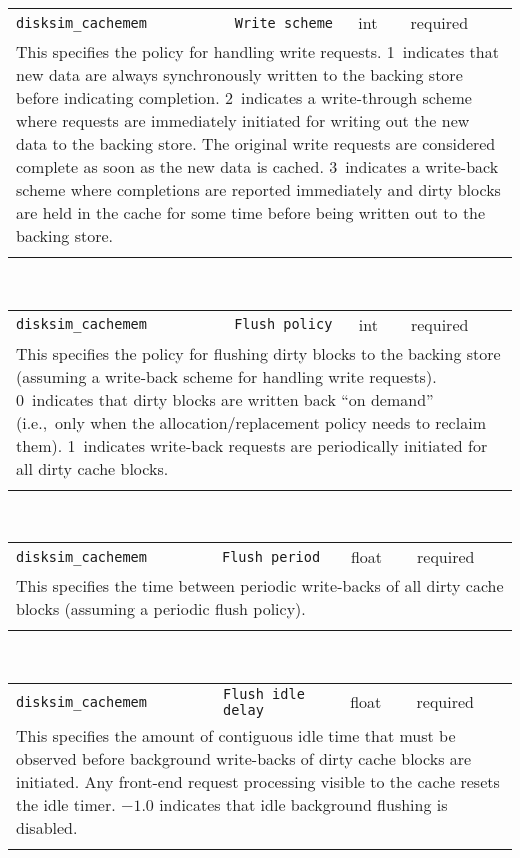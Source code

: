 \noindent 
\begin{tabular}{|p{1.5in}|p{3.5in}|p{0.5in}|p{0.5in}|}
\cline{1-4}
\texttt{disksim\_cachemem} & \texttt{Write scheme} & int & required \\ 
\cline{1-4}
\multicolumn{4}{|p{6in}|}{
This specifies the policy for handling write requests.
1~indicates that new data are always synchronously written to the
backing store before indicating completion.
2~indicates a write-through scheme where requests are immediately
initiated for writing out the new data to the backing store. The
original write requests are considered complete as soon as the new
data is cached.
3~indicates a write-back scheme where completions are reported
immediately and dirty blocks are held in the cache for some time
before being written out to the backing store.
}\\ 
\cline{1-4}
\multicolumn{4}{p{5in}}{}\\
\end{tabular}\\ 
\noindent 
\begin{tabular}{|p{1.5in}|p{3.5in}|p{0.5in}|p{0.5in}|}
\cline{1-4}
\texttt{disksim\_cachemem} & \texttt{Flush policy} & int & required \\ 
\cline{1-4}
\multicolumn{4}{|p{6in}|}{
This specifies the policy for flushing dirty blocks to the backing store
(assuming a write-back scheme for handling write requests).
0~indicates that dirty blocks are written back ``on demand''
(i.e.,~only when the allocation/replacement policy needs to reclaim
them).
1~indicates write-back requests are periodically initiated for all
dirty cache blocks.
}\\ 
\cline{1-4}
\multicolumn{4}{p{5in}}{}\\
\end{tabular}\\ 
\noindent 
\begin{tabular}{|p{1.5in}|p{3.5in}|p{0.5in}|p{0.5in}|}
\cline{1-4}
\texttt{disksim\_cachemem} & \texttt{Flush period} & float & required \\ 
\cline{1-4}
\multicolumn{4}{|p{6in}|}{
This specifies the time between periodic write-backs of all dirty cache
blocks (assuming a periodic flush policy).
}\\ 
\cline{1-4}
\multicolumn{4}{p{5in}}{}\\
\end{tabular}\\ 
\noindent 
\begin{tabular}{|p{1.5in}|p{3.5in}|p{0.5in}|p{0.5in}|}
\cline{1-4}
\texttt{disksim\_cachemem} & \texttt{Flush idle delay} & float & required \\ 
\cline{1-4}
\multicolumn{4}{|p{6in}|}{
This specifies the amount of contiguous idle time that must be observed
before background write-backs of dirty cache blocks are initiated.
Any front-end request processing visible to the cache resets the idle
timer. $-1.0$ indicates that idle background flushing is disabled.
}\\ 
\cline{1-4}
\multicolumn{4}{p{5in}}{}\\
\end{tabular}\\ 
